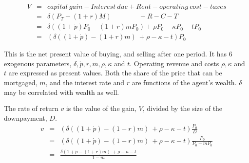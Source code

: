 \begin{eqnarray*}
V  	&=& capital\ gain - Interest\ due  	+ Rent  - operating\ cost -taxes\\
&=& \delta(P_T- (1+r)M) \qquad \qquad 	 + R  	-C   - T\\
&=& \delta((1+\dot p)  P_0- (1+r)mP_0)   + \rho P_0  	-\kappa P_0 - tP_0\\
&=&( \delta((1+\dot p)  - (1+r)m) \ + \rho   	-\kappa -t) P_0
\end{eqnarray*}

This is the  net present value of buying, and selling after one period. It has  6 exogenous parameters, $\delta, \dot p, r, m, \rho, \kappa$ and $t$.   Operating revenue and costs $\rho, \kappa$ and $t$ are expressed as  present values. Both the  share of the price  that can be mortgaged, $m$, and the interest rate  and $r$ are functions of the agent's wealth. $\delta$ may be correlated with wealth as well. 

The rate of return $v$ is the value of the gain, $V$, divided by  the size of the downpayment, $D$. 
\begin{eqnarray}
v&=&( \delta((1+\dot p)  - (1+r)m) \ + \rho   	-\kappa - t ) \frac{P_0}{D}   \nonumber\\
		&=&( \delta((1+\dot p)  - (1+r)m) \ + \rho   	-\kappa - t ) \frac{P_0}{P_0-mP_0}   \nonumber\\
		&=&\frac{ \delta(1+\dot p  - (1+r)m) \ + \rho   	-\kappa - t } {1-m} \label{Eqn:DecisionRule}
\end{eqnarray}







